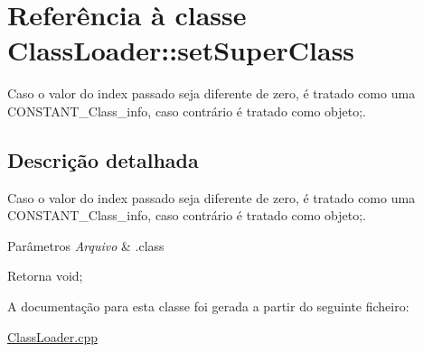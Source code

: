 \hypertarget{class_class_loader_1_1set_super_class}{}\section{Referência à classe Class\+Loader\+:\+:set\+Super\+Class}
\label{class_class_loader_1_1set_super_class}


Caso o valor do index passado seja diferente de zero, é tratado como uma C\+O\+N\+S\+T\+A\+N\+T\+\_\+\+Class\+\_\+info, caso contrário é tratado como objeto;.  




\subsection{Descrição detalhada}
Caso o valor do index passado seja diferente de zero, é tratado como uma C\+O\+N\+S\+T\+A\+N\+T\+\_\+\+Class\+\_\+info, caso contrário é tratado como objeto;. 


\begin{DoxyParams}{Parâmetros}
{\em Arquivo} & .class \\
\hline
\end{DoxyParams}
\begin{DoxyReturn}{Retorna}
void; 
\end{DoxyReturn}


A documentação para esta classe foi gerada a partir do seguinte ficheiro\+:\begin{DoxyCompactItemize}
\item 
\hyperlink{_class_loader_8cpp}{Class\+Loader.\+cpp}\end{DoxyCompactItemize}

